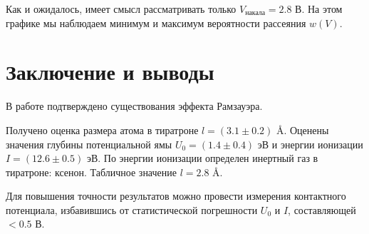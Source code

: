 \documentclass[12pt,a4paper]{article}
\begin{document}
	Как и ожидалось, имеет смысл рассматривать только $V_{\text{накала}} = 2.8$ В. На этом графике мы наблюдаем минимум и максимум вероятности рассеяния $w(V)$. 
	
	\section*{Заключение и выводы}
	
	В работе подтверждено существования эффекта Рамзауэра.
	
	Получено оценка размера атома в тиратроне $l = (3.1 \pm 0.2)$ \AA. Оценены значения глубины потенциальной ямы $U_0 = (1.4 \pm 0.4)$ эВ и энергии ионизации $I = (12.6 \pm 0.5)$ эВ. По энергии ионизации определен инертный газ в тиратроне: ксенон. Табличное значение $l = 2.8$ \AA.

	Для повышения точности результатов можно провести измерения контактного потенциала, избавившись от статистической погрешности $U_0$ и $I$, составляющей $<0.5$ В.
\end{document}
